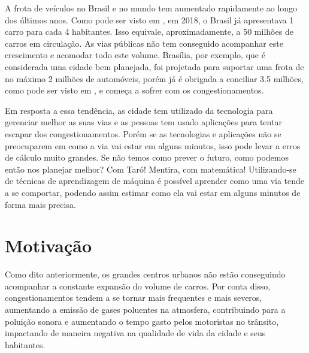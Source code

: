 
A frota  de  veículos no Brasil e no mundo tem aumentado rapidamente ao longo  dos últimos anos. Como pode ser visto em \cite{G1}, em 2018, o Brasil já apresentava 1 carro para cada 4 habitantes. Isso equivale, aproximadamente, a 50 milhões de carros em circulação. As vias públicas não tem conseguido acompanhar este crescimento e acomodar todo este volume. Brasília, por exemplo, que é considerada uma cidade bem planejada, foi projetada para suportar uma frota de no máximo 2 milhões de automóveis, porém já é obrigada a conciliar 3.5 milhões, como pode ser visto em \cite{detran_2018}, e começa a sofrer com os congestionamentos.

Em resposta a essa tendência, as cidade tem utilizado da tecnologia para gerenciar melhor as suas vias e as pessoas tem usado aplicações para tentar escapar dos congestionamentos. Porém se as tecnologias e aplicações não se preocuparem em como a via vai estar em alguns minutos, isso pode levar a erros de cálculo muito grandes. Se não temos como prever o futuro, como podemos então nos planejar melhor? Com Taró! Mentira, com matemática! Utilizando-se de técnicas de aprendizagem de máquina é possível aprender como uma via tende a se comportar, podendo assim estimar como ela vai estar em alguns minutos de forma mais precisa.


\section{Motivação}
Como dito anteriormente, os grandes centros urbanos não estão conseguindo acompanhar a constante expansão do volume de carros. Por conta disso, congestionamentos tendem a se tornar mais frequentes e mais severos, aumentando a emissão de gases poluentes na atmosfera, contribuindo para a poluição sonora e aumentando o tempo gasto pelos motoristas no trânsito, impactando de maneira negativa na qualidade de vida da cidade e seus habitantes. %

